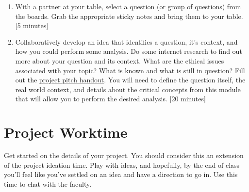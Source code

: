 \begin{prob}
\begin{enumerate}
\item With a partner at your table, select a question (or group of questions) from the boards. Grab the appropriate sticky notes and bring them to your table. [5 minutes]
\item Collaboratively develop an idea that identifies a question, it's context, and how you could perform some analysis. Do some internet research to find out more about your question and its context. What are the ethical issues associated with your topic? What is known and what is still in question? Fill out the \href{https://drive.google.com/file/d/1JhAOYK4TXdeA8rMV2zZwerRZf25l1zku/view?usp=sharing}{project pitch handout}. You will need to define the question itself, the real world context, and details about the critical concepts from this module that will allow you to perform the desired analysis. [20 minutes]
\end{enumerate}
\end{prob}

\section{Project Worktime}
Get started on the details of your project. You should consider this an extension of the project ideation time. Play with ideas, and hopefully, by the end of class you'll feel like you've settled on an idea and have a direction to go in. Use this time to chat with the faculty.